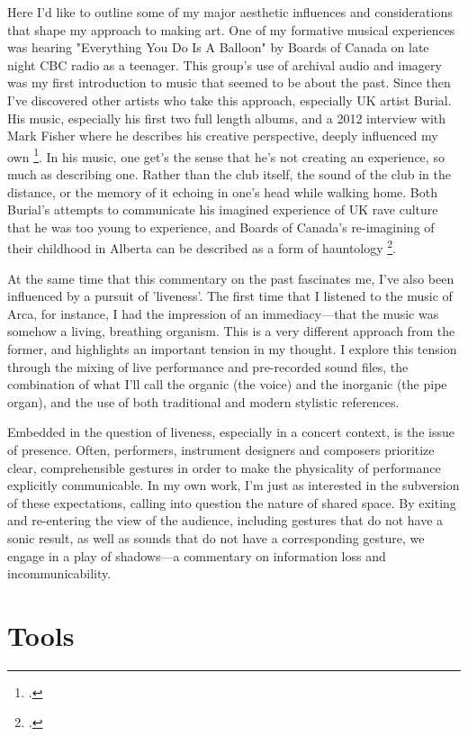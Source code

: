 \documentclass[12pt,twoside,maitrise]{dms_ks}
\theoremstyle{definition}
\begin{document}
{Here I'd like to outline some of my major aesthetic influences and considerations that shape my approach to making art. 
One of my formative musical experiences was hearing "Everything You Do Is A Balloon" by Boards of Canada on late night CBC radio as a teenager. 
This group's use of archival audio and imagery was my first introduction to music that seemed to be about the past. 
Since then I've discovered other artists who take this approach, especially UK artist Burial. 
His music, especially his first two full length albums, and a 2012 interview with Mark Fisher where he describes his creative perspective, deeply influenced my own \footcite{fisher_burial_2012}. 
In his music, one get's the sense that he's not creating an experience, so much as describing one. 
Rather than the club itself, the sound of the club in the distance, or the memory of it echoing in one's head while walking home. 
Both Burial's attempts to communicate his imagined experience of UK rave culture that he was too young to experience, and Boards of Canada's re-imagining of their childhood in Alberta can be described as a form of hauntology \footcite{alary_vers_2020}.

At the same time that this commentary on the past fascinates me, I've also been influenced by a pursuit of 'liveness'. 
The first time that I listened to the music of Arca, for instance, I had the impression of an immediacy---that the music was somehow a living, breathing organism. 
This is a very different approach from the former, and highlights an important tension in my thought. 
I explore this tension through the mixing of live performance and pre-recorded sound files, the combination of what I'll call the organic (the voice) and the inorganic (the pipe organ), and the use of both traditional and modern stylistic references.

Embedded in the question of liveness, especially in a concert context, is the issue of presence. 
Often, performers, instrument designers and composers prioritize clear, comprehensible gestures in order to make the physicality of performance explicitly communicable. 
In my own work, I'm just as interested in the subversion of these expectations, calling into question the nature of shared space. 
By exiting and re-entering the view of the audience, including gestures that do not have a sonic result, as well as sounds that do not have a corresponding gesture, we engage in a play of shadows---a commentary on information loss and incommunicability. 

\section{Tools}

}
\end{document}
